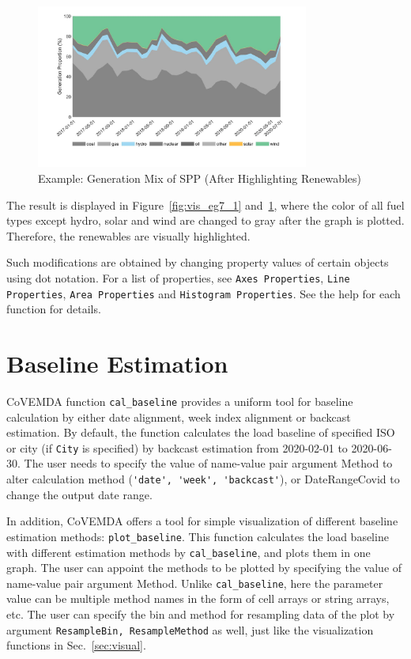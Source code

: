 \documentclass[11pt]{article}
\newcommand{\covemda}{CoVEMDA}
\numberwithin{equation}{section}
\numberwithin{table}{section}
\numberwithin{figure}{section}
\begin{document}
\begin{figure}
  \centering
  \noindent\includegraphics[width=0.8\textwidth]{figures/visualization_example7_2.jpg}
  \caption{Example: Generation Mix of SPP (After Highlighting Renewables)} \label{fig:vis_eg7_2}
\end{figure}

The result is displayed in Figure~\ref{fig:vis_eg7_1} and~\ref{fig:vis_eg7_2}, where the color of all fuel types except hydro, solar and wind are changed to gray after the graph is plotted. Therefore, the renewables are visually highlighted.

Such modifications are obtained by changing property values of certain objects using dot notation. For a list of properties, see \verb!Axes Properties!, \verb!Line Properties!, \verb!Area Properties! and \verb!Histogram Properties!. See the help for each function for details.





\newpage
\section{Baseline Estimation} \label{sec:baseline}



\covemda{} function \verb!cal_baseline! provides a uniform tool for baseline calculation by either date alignment, week index alignment or backcast estimation. By default, the function calculates the load baseline of specified ISO or city (if \verb!City! is specified) by backcast estimation from 2020-02-01 to 2020-06-30. The user needs to specify the value of name-value pair argument Method to alter calculation method (\verb!'date', 'week', 'backcast'!), or DateRangeCovid to change the output date range.

In addition, \covemda{} offers a tool for simple visualization of different baseline estimation methods: \verb!plot_baseline!. This function calculates the load baseline with different estimation methods by \verb!cal_baseline!, and plots them in one graph. The user can appoint the methods to be plotted by specifying the value of name-value pair argument Method. Unlike \verb!cal_baseline!, here the parameter value can be multiple method names in the form of cell arrays or string arrays, etc. The user can specify the bin and method for resampling data of the plot by argument \verb!ResampleBin, ResampleMethod! as well, just like the visualization functions in Sec.~\ref{sec:visual}.
\end{document}
